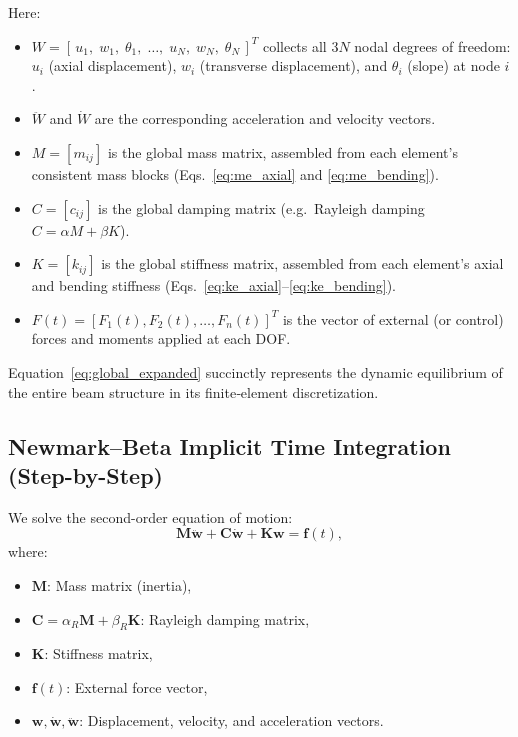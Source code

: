 \documentclass{article}
\begin{document}
	Here:
	\begin{itemize}
		\item \(W = [\,u_1,\;w_1,\;\theta_1,\;\dots,\;u_N,\;w_N,\;\theta_N\,]^T\) collects all \(3N\) nodal degrees of freedom: 
		\(u_i\) (axial displacement), \(w_i\) (transverse displacement), and \(\theta_i\) (slope) at node \(i\).
		\item \(\ddot W\) and \(\dot W\) are the corresponding acceleration and velocity vectors.
		\item \(M = [m_{ij}]\) is the global mass matrix, assembled from each element’s consistent mass blocks (Eqs.~\eqref{eq:me_axial} and \eqref{eq:me_bending}).
		\item \(C = [c_{ij}]\) is the global damping matrix (e.g.\ Rayleigh damping \(C=\alpha M + \beta K\)).
		\item \(K = [k_{ij}]\) is the global stiffness matrix, assembled from each element’s axial and bending stiffness (Eqs.~\eqref{eq:ke_axial}–\eqref{eq:ke_bending}).
		\item \(F(t) = [F_1(t),F_2(t),\dots,F_n(t)]^T\) is the vector of external (or control) forces and moments applied at each DOF.
	\end{itemize}
	
	Equation~\eqref{eq:global_expanded} succinctly represents the dynamic equilibrium of the entire beam structure in its finite‐element discretization.
	
		

	
	\subsection*{Newmark--Beta Implicit Time Integration (Step-by-Step)}
	
	We solve the second-order equation of motion:
	\begin{equation}
		\mathbf{M} \ddot{\mathbf{w}} + \mathbf{C} \dot{\mathbf{w}} + \mathbf{K} \mathbf{w} = \mathbf{f}(t),
	\end{equation}
	where:
	\begin{itemize}
		\item \( \mathbf{M} \): Mass matrix (inertia),
		\item \( \mathbf{C} = \alpha_R \mathbf{M} + \beta_R \mathbf{K} \): Rayleigh damping matrix,
		\item \( \mathbf{K} \): Stiffness matrix,
		\item \( \mathbf{f}(t) \): External force vector,
		\item \( \mathbf{w}, \dot{\mathbf{w}}, \ddot{\mathbf{w}} \): Displacement, velocity, and acceleration vectors.
	\end{itemize}
	
\end{document}
